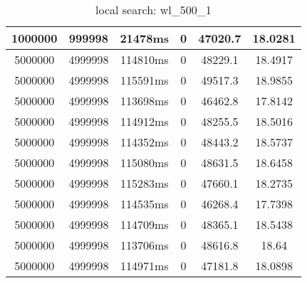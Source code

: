\documentclass[./main.tex]{subfiles}
\begin{document}
\begin{table}
\begin{tabular}{ c | c | c | c | c | c }
        \rowcolor{lightgray} 1000000 & 999998 & 21478ms & 0 & 47020.7 & 18.0281 \\
        \hline
        5000000 & 4999998 & 114810ms & 0 & 48229.1 & 18.4917 \\
        5000000 & 4999998 & 115591ms & 0 & 49517.3 & 18.9855 \\
        5000000 & 4999998 & 113698ms & 0 & 46462.8 & 17.8142 \\
        \rowcolor{lightgray} 5000000 & 4999998 & 114912ms & 0 & 48255.5 & 18.5016 \\
        5000000 & 4999998 & 114352ms & 0 & 48443.2 & 18.5737 \\
        5000000 & 4999998 & 115080ms & 0 & 48631.5 & 18.6458 \\
        5000000 & 4999998 & 115283ms & 0 & 47660.1 & 18.2735 \\
        5000000 & 4999998 & 114535ms & 0 & 46268.4 & 17.7398 \\
        5000000 & 4999998 & 114709ms & 0 & 48365.1 & 18.5438 \\
        5000000 & 4999998 & 113706ms & 0 & 48616.8 & 18.64 \\
        5000000 & 4999998 & 114971ms & 0 & 47181.8 & 18.0898 \\
    \end{tabular}
    \caption{local search: wl\_500\_1}
\end{table}
\end{document}
